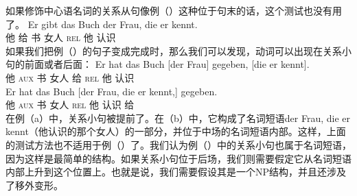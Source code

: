 \noindent
如果修饰中心语名词的关系从句像例（）这种位于句末的话，这个测试也没有用了。
\ea
\gll Er gibt das Buch der Frau, die er kennt.\\
      他 给  书  女人 \textsc{rel} 他 认识\\
\z
如果我们把例（）的句子变成完成时，那么我们可以发现，动词可以出现在关系小句的前面或者后面：
\eal
\ex 
\gll Er hat das Buch [der Frau] gegeben, [die er kennt].\\
     他 \textsc{aux}  书 \spacebr{} 女人 给 \spacebr{}\textsc{rel} 他 认识\\
\ex 
\gll Er hat das Buch [der Frau, die er kennt,] gegeben.\\
	 他 \textsc{aux}  书 \spacebr{} 女人 \textsc{rel} 他 认识 给\\
\zl
在例（a）中，关系小句被提前了。在（b）中，它构成了名词短语der Frau, die er kennt（他认识的那个女人）的一部分，并位于中场的名词短语内部。这样，上面的测试方法也不适用于例（）了。我们认为例（）中的关系小句也属于名词短语，因为这样是最简单的结构。如果关系小句位于后场，我们则需要假定它从名词短语内部上升到这个位置上。也就是说，我们需要假设其是一个NP结构，并且还涉及了移外变形。
%
